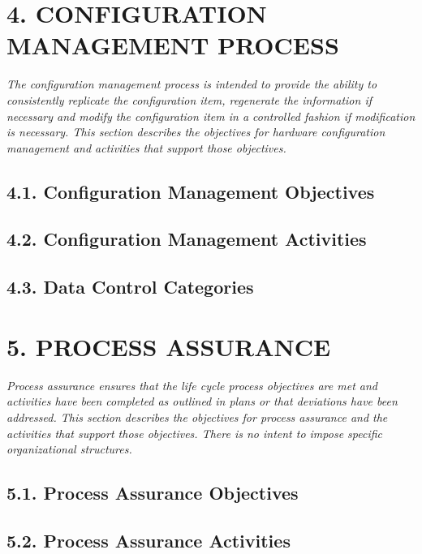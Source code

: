 \documentclass[]{article}
\begin{document}
\section{4. CONFIGURATION MANAGEMENT
PROCESS}\label{configuration-management-process}

\emph{The configuration management process is intended to provide the
ability to consistently replicate the configuration item, regenerate the
information if necessary and modify the configuration item in a
controlled fashion if modification is necessary. This section describes
the objectives for hardware configuration management and activities that
support those objectives.}

\subsection{4.1. Configuration Management
Objectives}\label{configuration-management-objectives}

\subsection{4.2. Configuration Management
Activities}\label{configuration-management-activities}

\subsection{4.3. Data Control Categories}\label{data-control-categories}

\section{5. PROCESS ASSURANCE}\label{process-assurance}

\emph{Process assurance ensures that the life cycle process objectives
are met and activities have been completed as outlined in plans or that
deviations have been addressed. This section describes the objectives
for process assurance and the activities that support those objectives.
There is no intent to impose specific organizational structures.}

\subsection{5.1. Process Assurance
Objectives}\label{process-assurance-objectives}

\subsection{5.2. Process Assurance
Activities}\label{process-assurance-activities}
\end{document}
